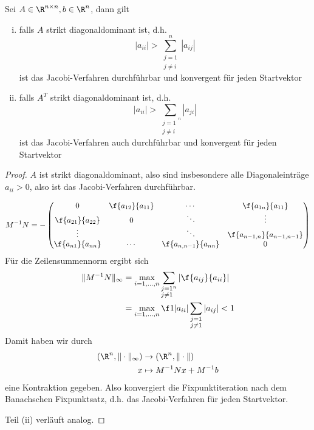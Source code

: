\documentclass{mycourse}
\begin{document}
\begin{st}
	\label{st:4.8}
	Sei $A\in \R^{n\times n}, b\in \R^n$, dann gilt
	\begin{enumerate}[(i)]
		\item
			falls $A$ strikt diagonaldominant ist, d.h.
			\[
				|a_{ii}| > \sum_{\substack{j=1\\j\neq i}}^n|a_{ij}|
			\]
			ist das Jacobi-Verfahren durchführbar und konvergent für jeden Startvektor
		\item
			falls $A^T$ strikt diagonaldominant ist, d.h.
			\[
				|a_{ii}| > \sum_{\substack{j=1\\j\neq i}^n}|a_{ji}|
			\]
			ist das Jacobi-Verfahren auch durchführbar und konvergent für jeden Startvektor
	\end{enumerate}
	\begin{proof}
		$A$ ist strikt diagonaldominant, also sind insbesondere alle Diagonaleinträge $a_{ii}>0$, also ist das Jacobi-Verfahren durchführbar.

		\[
			M^{-1}N = -\begin{pmatrix}
				0 & \f {a_{12}}{a_{11}} &  \cdots & \f {a_{1n}}{a_{11}}\\
				\f {a_{21}}{a_{22}} & 0 & \ddots  & \vdots\\
				
				\vdots & & \ddots & \f {a_{n-1,n}}{a_{n-1,n-1}}\\
				\f {a_{n1}}{a_{nn}} & \cdots &  \f {a_{n,n-1}}{a_{nn}} & 0
			\end{pmatrix}
		\]
		Für die Zeilensummennorm ergibt sich
		\begin{align*}
			\|M^{-1}N\|_\infty 
				&= \max_{i=1,\dotsc,n} \sum_{\substack{j=1\\j\neq 1}^n}\left|\f {a_{ij}}{a_{ii}}\right| \\
     			&= \max_{i=1,\dotsc,n} \f 1{|a_{ii}|} \sum_{\substack{j=1\\j\neq 1}}|a_{ij}| < 1
		\end{align*}
		Damit haben wir durch
		\begin{align*}
			(\R^n, \|\cdot\|_{\infty}) &\to (\R^n, \|\cdot\|)\\
			x & \mapsto M^{-1}Nx + M^{-1}b
		\end{align*}
		eine Kontraktion gegeben.
		Also konvergiert die Fixpunktiteration nach dem Banachschen Fixpunktsatz, d.h. das Jacobi-Verfahren für jeden Startvektor.

		Teil (ii) verläuft analog.
	\end{proof}
\end{st}
\end{document}

